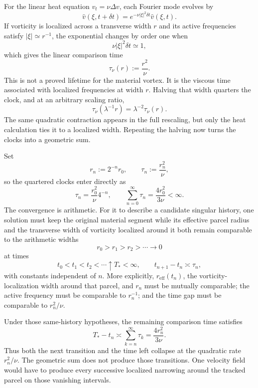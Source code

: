 For the linear heat equation \(v_t=\nu\Delta v\), each Fourier mode evolves by
\[
  \widehat v(\xi,t+\delta t)
  =
  e^{-\nu|\xi|^2\delta t}\widehat v(\xi,t).
\]
If vorticity is localized across a transverse width \(r\) and its active frequencies satisfy \(|\xi|\simeq r^{-1}\), the exponential changes by order one when
\[
  \nu|\xi|^2\delta t\simeq1,
\]
which gives the linear comparison time
\[
  \tau_\nu(r)
  :=
  \frac{r^2}{\nu}.
\]
This is not a proved lifetime for the material vortex. It is the viscous time associated with localized frequencies at width \(r\). Halving that width quarters the clock, and at an arbitrary scaling ratio,
\[
  \tau_\nu(\lambda^{-1}r)
  =
  \lambda^{-2}\tau_\nu(r).
\]
The same quadratic contraction appears in the full rescaling, but only the heat calculation ties it to a localized width. Repeating the halving now turns the clocks into a geometric sum.


Set
\[
  r_n:=2^{-n}r_0,
  \qquad
  \tau_n:=\frac{r_n^2}{\nu},
\]
so the quartered clocks enter directly as
\[
  \tau_n
  =
  \frac{r_0^2}{\nu}4^{-n},
  \qquad
  \sum_{n=0}^{\infty}\tau_n
  =
  \frac{4r_0^2}{3\nu}
  <
  \infty.
\]
The convergence is arithmetic. For it to describe a candidate singular history, one \NavierStokes{} solution must keep the original material segment while its effective parcel radius and the transverse width of vorticity localized around it both remain comparable to the arithmetic widths
\[
  r_0>r_1>r_2>\cdots\longrightarrow0
\]
at times
\[
  t_0<t_1<t_2<\cdots\uparrow T_*<\infty,
  \qquad
  t_{n+1}-t_n\asymp\tau_n,
\]
with constants independent of \(n\). More explicitly, \(r_{\mathrm{eff}}(t_n)\), the vorticity-localization width around that parcel, and \(r_n\) must be mutually comparable; the active frequency must be comparable to \(r_n^{-1}\); and the time gap must be comparable to \(r_n^2/\nu\).

Under those same-history hypotheses, the remaining comparison time satisfies
\[
  T_*-t_n
  \asymp
  \sum_{k=n}^{\infty}\tau_k
  =
  \frac{4r_n^2}{3\nu}.
\]
Thus both the next transition and the time left collapse at the quadratic rate \(r_n^2/\nu\). The geometric sum does not produce those transitions. One velocity field would have to produce every successive localized narrowing around the tracked parcel on those vanishing intervals.